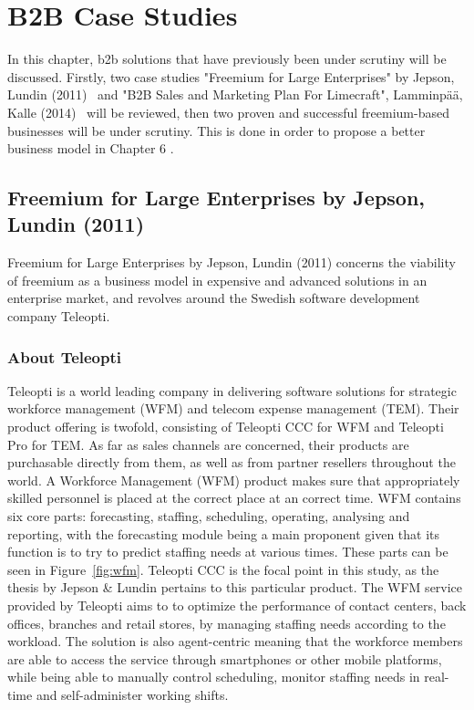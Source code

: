 \chapter{B2B Case Studies}
In this chapter, \gls{b2b} solutions that have previously been under scrutiny will be discussed. Firstly, two case studies "Freemium for Large Enterprises" by Jepson, Lundin (2011)~\cite{jepson2009freemium} and "B2B Sales and Marketing Plan For Limecraft", Lamminpää, Kalle (2014)~\cite{lamminpaa2014b2b} will be reviewed, then two proven and successful freemium-based businesses will be under scrutiny. This is done in order to propose a better business model in Chapter 6
.
\section{Freemium for Large Enterprises by Jepson, Lundin (2011)}
Freemium for Large Enterprises by Jepson, Lundin (2011) concerns the viability of freemium as a business model in expensive and advanced solutions in an enterprise market, and revolves around the Swedish software development company Teleopti.

\subsection{About Teleopti}
Teleopti is a world leading company in delivering software solutions for strategic workforce management (WFM) and telecom expense management (TEM). Their product offering is twofold, consisting of Teleopti CCC for WFM and Teleopti Pro for TEM. As far as sales channels are concerned, their products are purchasable directly from them, as well as from partner resellers throughout the world. A Workforce Management (WFM) product makes sure that appropriately skilled personnel is placed at the correct place at an correct time. WFM contains six core parts: forecasting, staffing, scheduling, operating, analysing and reporting, with the forecasting module being a main proponent given that its function is to try to predict staffing needs at various times. These parts can be seen in Figure~\ref{fig:wfm}. Teleopti CCC is the focal point in this study, as the thesis by Jepson \& Lundin pertains to this particular product. The WFM service provided by Teleopti aims to to optimize the performance of contact centers, back offices, branches and retail stores, by managing staffing needs according to the workload. The solution is also agent-centric meaning that the workforce members are able to access the service through smartphones or other mobile platforms, while being able to manually control scheduling, monitor staffing needs in real-time and self-administer working shifts.  

